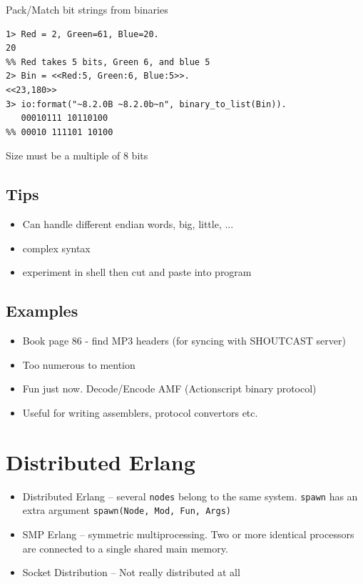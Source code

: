 \documentclass[12pt]{article}
\begin{document}
Pack/Match bit strings from binaries

\begin{verbatim}
1> Red = 2, Green=61, Blue=20.
20
%% Red takes 5 bits, Green 6, and blue 5
2> Bin = <<Red:5, Green:6, Blue:5>>.
<<23,180>>
3> io:format("~8.2.0B ~8.2.0b~n", binary_to_list(Bin)).
   00010111 10110100
%% 00010 111101 10100
\end{verbatim}

Size must be a multiple of 8 bits

\subsection{Tips}

\begin{itemize}
\item Can handle different endian words, big, little, ...
\item complex syntax
\item experiment in shell then cut and paste into program
\end{itemize}

\subsection{Examples}

\begin{itemize}
\item Book page 86 - find MP3 headers (for syncing with SHOUTCAST server)

\item Too numerous to mention

\item Fun just now. Decode/Encode AMF (Actionscript binary protocol)

\item Useful for writing assemblers, protocol convertors etc.
\end{itemize}

\section{ Distributed Erlang}

\begin{itemize}
\item Distributed Erlang -- several \verb+nodes+ belong to the same
  system.  \verb+spawn+ has an extra argument
  \verb+spawn(Node, Mod, Fun, Args)+
\item SMP Erlang -- symmetric multiprocessing. Two or more identical
  processors are connected to a single shared main memory.
\item Socket Distribution -- Not really distributed at all
\end{itemize}
\end{document}
